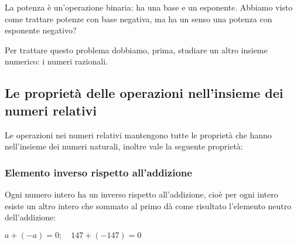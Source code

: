 \begin{osservazione}
La potenza è un'operazione binaria: ha una base e un esponente. Abbiamo 
visto come trattare potenze con base negativa, ma ha un senso una potenza 
con esponente negativo?

Per trattare questo problema dobbiamo, prima, studiare un altro insieme 
numerico: i numeri razionali.
\end{osservazione}



\subsection{Le proprietà delle operazioni nell'insieme dei numeri relativi}

Le operazioni nei numeri relativi mantengono tutte le proprietà che hanno 
nell'insieme dei numeri naturali, inoltre vale la seguente proprietà:

\subsubsection{Elemento inverso rispetto all'addizione}

Ogni numero intero ha un inverso rispetto all'addizione, cioè per ogni 
intero 
esiste un altro intero che sommato al primo dà come risultato l'elemento 
neutro 
dell'addizione:

\(a + (-a) = 0; \quad 147 + (-147) = 0\)

